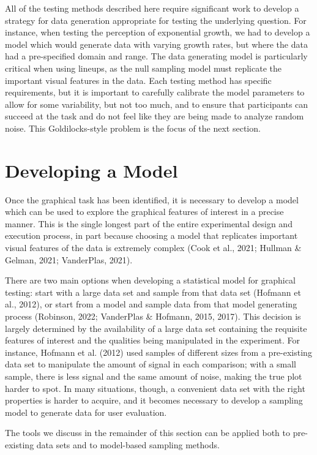 \documentclass[
  10pt,
  letterpaper,
  DIV=11,
  numbers=noendperiod]{scrartcl}
\begin{document}
All of the testing methods described here require significant work to
develop a strategy for data generation appropriate for testing the
underlying question. For instance, when testing the perception of
exponential growth, we had to develop a model which would generate data
with varying growth rates, but where the data had a pre-specified domain
and range. The data generating model is particularly critical when using
lineups, as the null sampling model must replicate the important visual
features in the data. Each testing method has specific requirements, but
it is important to carefully calibrate the model parameters to allow for
some variability, but not too much, and to ensure that participants can
succeed at the task and do not feel like they are being made to analyze
random noise. This Goldilocks-style problem is the focus of the next
section.

\section{Developing a Model}\label{sec-model-dev}

Once the graphical task has been identified, it is necessary to develop
a model which can be used to explore the graphical features of interest
in a precise manner. This is the single longest part of the entire
experimental design and execution process, in part because choosing a
model that replicates important visual features of the data is extremely
complex (Cook et al., 2021; Hullman \& Gelman, 2021; VanderPlas, 2021).

There are two main options when developing a statistical model for
graphical testing: start with a large data set and sample from that data
set (Hofmann et al., 2012), or start from a model and sample data from
that model generating process (Robinson, 2022; VanderPlas \& Hofmann,
2015, 2017). This decision is largely determined by the availability of
a large data set containing the requisite features of interest and the
qualities being manipulated in the experiment. For instance, Hofmann et
al. (2012) used samples of different sizes from a pre-existing data set
to manipulate the amount of signal in each comparison; with a small
sample, there is less signal and the same amount of noise, making the
true plot harder to spot. In many situations, though, a convenient data
set with the right properties is harder to acquire, and it becomes
necessary to develop a sampling model to generate data for user
evaluation.

The tools we discuss in the remainder of this section can be applied
both to pre-existing data sets and to model-based sampling methods.
\end{document}
